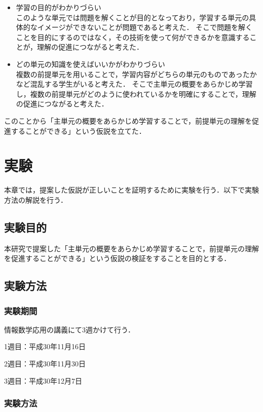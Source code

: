 \documentclass[a4j,12pt]{jsarticle}
\begin{document}
\begin{itemize}
\item 学習の目的がわかりづらい\\

このような単元では問題を解くことが目的となっており，学習する単元の具体的なイメージができないことが問題であると考えた．
そこで問題を解くことを目的にするのではなく，その技術を使って何ができるかを意識することが，理解の促進につながると考えた．


\item どの単元の知識を使えばいいかがわかりづらい\\
複数の前提単元を用いることで，学習内容がどちらの単元のものであったかなど混乱する学生がいると考えた．
そこで主単元の概要をあらかじめ学習し，複数の前提単元がどのように使われているかを明確にすることで，理解の促進につながると考えた．

\end{itemize}

このことから「主単元の概要をあらかじめ学習することで，前提単元の理解を促進することができる」という仮説を立てた．


\newpage
\section{実験}
本章では，提案した仮説が正しいことを証明するために実験を行う．以下で実験方法の解説を行う．
\subsection{実験目的}
本研究で提案した「主単元の概要をあらかじめ学習することで，前提単元の理解を促進することができる」という仮説の検証をすることを目的とする．

\subsection{実験方法}
\subsubsection{実験期間}

情報数学応用の講義にて3週かけて行う．

1週目：平成30年11月16日

2週目：平成30年11月30日

3週目：平成30年12月7日


\subsubsection{実験方法}
\end{document}
